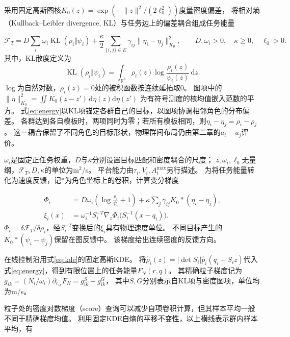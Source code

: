 \documentclass[UTF8,a4paper,11pt,fontset=none]{ctexart}
\newcommand{\R}{\mathbb R}\newcommand{\KL}{\operatorname{KL}}
\begin{document}
采用固定高斯图核$K_0(z)=\exp(-\|z\|^2/(2\ell_0^2))$度量密度偏差，
将相对熵（Kullback--Leibler divergence, KL）与任务边上的偏差耦合组成任务能量

\begin{equation}
\mathcal F_T=D\sum_i\omega_i\KL(\rho_i\Vert\psi_i)
+\frac\kappa2\sum_{\{i,j\}\in E}\gamma_{ij}\|\eta_i-\eta_j\|_{K_0}^2,
\qquad D,\omega_i>0,\quad\kappa\ge0,\quad\ell_0>0.
\label{eq:energy}
\end{equation}
其中，KL散度定义为
\[
\KL(\rho_i\Vert\psi_i)
=\int_{\R^3}\rho_i(z)\log\frac{\rho_i(z)}{\psi_i(z)}\,\mathrm dz .
\]
$\log$为自然对数，$\rho_i(z)=0$处的被积函数按连续延拓取0。
图项中的$\|\eta\|_{K_0}^2=\iint K_0(z-z')\,\mathrm d\eta(z)\mathrm d\eta(z')$
为有符号测度的核均值嵌入范数的平方。
式\eqref{eq:energy}以KL项锚定各群自己的目标，以图项协调相邻角色的分布偏差。
各群达到各自模板时，两项同时为零；若所有模板相同，则$\eta_i-\eta_j=\rho_i-\rho_j$。
这一耦合保留了不同角色的目标形状，物理群间布局仍由第二章的$a_i-a_j$评价。

$\omega_i$是固定正任务权重，$D$与$\kappa$分别设置目标匹配和密度耦合的尺度；
$z,\omega_i,\ell_0$无量纲，$\mathcal F_T,D,\kappa$的单位为m$^2$/s。
平台能力由$\tau_i,V_i,A_i^{\max}$另行描述。
为将任务能量转化为速度反馈，记$*$为角色坐标上的卷积，计算变分梯度

\begin{equation}
\begin{aligned}
\Phi_i&=D\omega_i\left(\log\frac{\rho_i}{\psi_i}+1\right)
+\kappa\sum_j\gamma_{ij}K_0*(\eta_i-\eta_j),\\
\xi_i(x)&=\omega_i^{-1}S_i^{-T}\nabla_z\Phi_i\big(S_i^{-1}(x-q_i)\big).
\end{aligned}
\label{eq:variational-gradient}
\end{equation}
$\Phi_i=\delta\mathcal F_T/\delta\rho_i$，经$S_i^{-T}$变换后的$\xi_i$具有物理速度单位。
不同目标产生的$K_0*(\psi_i-\psi_j)$保留在图反馈中。
该梯度给出连续密度的反馈方向。

在线控制沿用式\eqref{eq:kde}的固定高斯KDE。
将$\widehat\rho_i(z)=|\det S_i|\widehat p_i(q_i+S_i z)$代入式\eqref{eq:energy}，得到有限位置上的任务能量$F_N(r,q)$。
其精确粒子梯度记为
$g_{ik}=(N_i/\omega_i)\partial_{r_{ik}}F_N=g^S_{ik}+g^G_{ik}$，
其中$S,G$分别表示自KL项与密度图项，单位均为m/s。

粒子处的密度对数梯度（score）查询可以减少自项卷积计算，但其样本平均一般不同于精确梯度均值。
利用固定KDE自熵的平移不变性，以上横线表示群内样本平均，有
\end{document}
